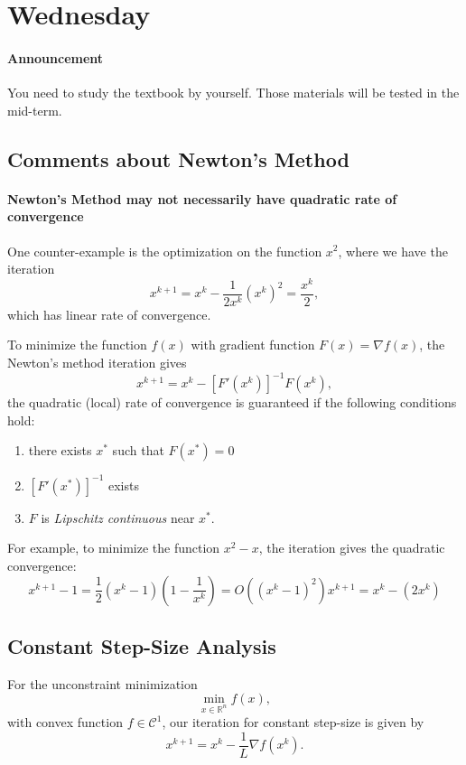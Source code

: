 
\section{Wednesday}
\paragraph{Announcement}
You need to study the textbook by yourself. Those materials will be tested in the mid-term.
\subsection{Comments about Newton's Method}
\paragraph{Newton's Method may not necessarily have quadratic rate of convergence} One counter-example is the optimization on the function $x^2$, where we have the iteration
\[
x^{k+1}=x^k-\frac{1}{2x^k}(x^k)^2=\frac{x^k}{2},
\]
which has linear rate of convergence.
\begin{theorem}
To minimize the function $f(x)$ with gradient function $F(x)=\nabla f(x)$, the Newton's method iteration gives
\[
x^{k+1}=x^k-\left[F'(x^k)\right]^{-1}F(x^k),
\]
the quadratic (local) rate of convergence is guaranteed if the following conditions hold:
\begin{enumerate}
\item
there exists $x^*$ such that $F(x^*)=0$
\item
$\left[F'(x^*)\right]^{-1}$ exists
\item
$F$ is \emph{Lipschitz continuous} near $x^*$.
\end{enumerate}
\end{theorem}
For example, to minimize the function $x^2-x$, the iteration gives the quadratic convergence:
\[
x^{k+1} - 1=\frac{1}{2}(x^k-1)(1-\frac{1}{x^k})=
O((x^k-1)^2)
x^{k+1}=x^k-(2x^k)
\]

\subsection{Constant Step-Size Analysis}
For the unconstraint minimization
\[
\min_{x\in\mathbb{R}^n}f(x),
\]
with convex function $f\in\mathcal{C}^1$, our iteration for constant step-size is given by
\[
x^{k+1} = x^k-\frac{1}{L}\nabla f(x^k).
\]

